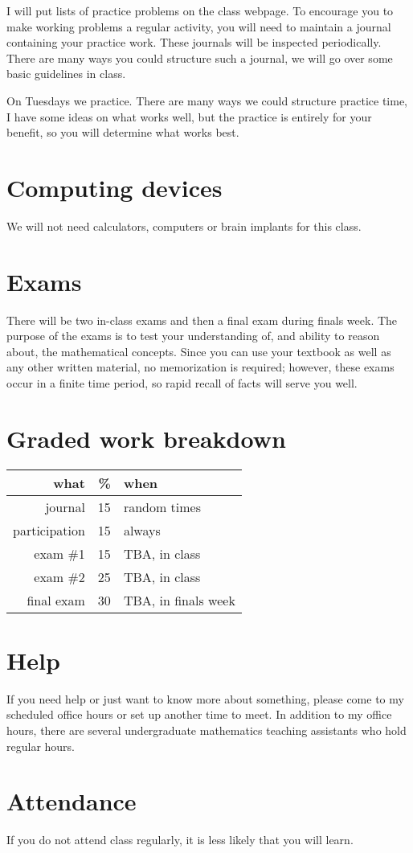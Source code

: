 \documentclass[12pt]{article}
\begin{document}
I will put lists of practice problems on the class webpage. 
To encourage you to make working problems a regular activity, you will need to maintain a journal containing your practice work.
These journals will be inspected periodically.  There are many ways you could structure such a journal, we will go over some
basic guidelines in class.

On Tuesdays we practice.  There are many ways we could structure practice time, I have some ideas on what works well, but the practice is
entirely for your benefit, so you will determine what works best.

\section*{Computing devices}
We will not need calculators, computers or brain implants for this class.  

\section*{Exams}
There will be two in-class exams and then a final exam during finals week. 
The purpose of the exams is to test your understanding of, and ability to reason about, the mathematical concepts. 
Since you can use your textbook as well as any other written material, no memorization is required; however, 
these exams occur in a finite time period, so rapid recall of facts will serve you well. 

\section*{Graded work breakdown}
\begin{tabular}{r | r | l}
what & \% & when \\
\hline
journal & 15 & random times \\
participation & 15 & always\\
exam \#1 & 15 & TBA, in class \\
exam \#2 & 25 & TBA, in class \\
final exam & 30 & TBA, in finals week \\
\end{tabular}

\section*{Help}
If you need help or just want to know more about something, please come to my scheduled office hours or set up another time to meet. 
In addition to my office hours, there are several undergraduate mathematics teaching assistants who hold regular hours.

\section*{Attendance}
If you do not attend class regularly, it is less likely that you will learn.
\end{document}
